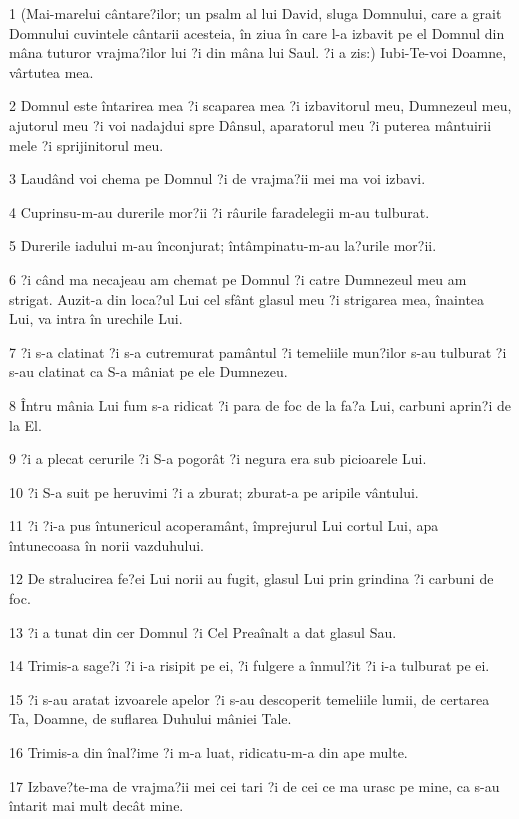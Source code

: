 \par 1 (Mai-marelui cântare?ilor; un psalm al lui David, sluga Domnului, care a grait Domnului cuvintele cântarii acesteia, în ziua în care l-a izbavit pe el Domnul din mâna tuturor vrajma?ilor lui ?i din mâna lui Saul. ?i a zis:) Iubi-Te-voi Doamne, vârtutea mea.
\par 2 Domnul este întarirea mea ?i scaparea mea ?i izbavitorul meu, Dumnezeul meu, ajutorul meu ?i voi nadajdui spre Dânsul, aparatorul meu ?i puterea mântuirii mele ?i sprijinitorul meu.
\par 3 Laudând voi chema pe Domnul ?i de vrajma?ii mei ma voi izbavi.
\par 4 Cuprinsu-m-au durerile mor?ii ?i râurile faradelegii m-au tulburat.
\par 5 Durerile iadului m-au înconjurat; întâmpinatu-m-au la?urile mor?ii.
\par 6 ?i când ma necajeau am chemat pe Domnul ?i catre Dumnezeul meu am strigat. Auzit-a din loca?ul Lui cel sfânt glasul meu ?i strigarea mea, înaintea Lui, va intra în urechile Lui.
\par 7 ?i s-a clatinat ?i s-a cutremurat pamântul ?i temeliile mun?ilor s-au tulburat ?i s-au clatinat ca S-a mâniat pe ele Dumnezeu.
\par 8 Întru mânia Lui fum s-a ridicat ?i para de foc de la fa?a Lui, carbuni aprin?i de la El.
\par 9 ?i a plecat cerurile ?i S-a pogorât ?i negura era sub picioarele Lui.
\par 10 ?i S-a suit pe heruvimi ?i a zburat; zburat-a pe aripile vântului.
\par 11 ?i ?i-a pus întunericul acoperamânt, împrejurul Lui cortul Lui, apa întunecoasa în norii vazduhului.
\par 12 De stralucirea fe?ei Lui norii au fugit, glasul Lui prin grindina ?i carbuni de foc.
\par 13 ?i a tunat din cer Domnul ?i Cel Preaînalt a dat glasul Sau.
\par 14 Trimis-a sage?i ?i i-a risipit pe ei, ?i fulgere a înmul?it ?i i-a tulburat pe ei.
\par 15 ?i s-au aratat izvoarele apelor ?i s-au descoperit temeliile lumii, de certarea Ta, Doamne, de suflarea Duhului mâniei Tale.
\par 16 Trimis-a din înal?ime ?i m-a luat, ridicatu-m-a din ape multe.
\par 17 Izbave?te-ma de vrajma?ii mei cei tari ?i de cei ce ma urasc pe mine, ca s-au întarit mai mult decât mine.
